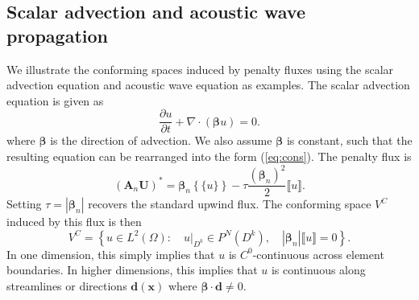 \documentclass[preprint,10pt]{elsarticle}
\newcommand{\pd}[2]{\frac{\partial#1}{\partial#2}}
\newcommand{\LRp}[1]{\left( #1 \right)}
\newcommand{\LRb}[1]{\left| #1 \right|}
\newcommand{\LRc}[1]{\left\{ #1 \right\}}
\newcommand{\Div} {\ensuremath{\nabla\cdot}}
\newcommand{\jump}[1] {\ensuremath{\llbracket#1\rrbracket}}
\newcommand{\avg}[1] {\ensuremath{\LRc{\!\{#1\}\!}}}
\newcommand{\note}[1]{{\color{blue}#1}}
\begin{document}
\subsection{Scalar advection and acoustic wave propagation}
\label{sec:confexamples}
We illustrate the conforming spaces induced by penalty fluxes using the scalar advection equation and acoustic wave equation as examples.  The scalar advection equation is given as
\[
\pd{u}{t} + \Div\LRp{\bm{\beta}u} = 0.
\]
where $\bm{\beta}$ is the direction of advection.  \note{We also assume $\bm{\beta}$ is constant, such that the resulting equation can be rearranged into the form (\ref{eq:cons}).}  The penalty flux is 
\[
(\bm{A}_n\bm{U})^* = \bm{\beta}_n\avg{ u} - \tau\frac{\LRp{\bm{\beta}_n}^2}{2}\jump{u}.
\]
\note{Setting $\tau = \LRb{\bm{\beta}_n}$ recovers the standard upwind flux.}  
The conforming space $V^C$ induced by this flux is then
\[
V^C = \LRc{ u \in L^2\LRp{\Omega} : \quad \left.u\right|_{D^k} \in P^N(D^k), \quad \LRb{\bm{\beta}_n}\jump{u} = 0}.
\]
In one dimension, this simply implies that $u$ is $C^0$-continuous across element boundaries.  In higher dimensions, this implies that $u$ is continuous along streamlines or directions $\bm{d}(\bm{x})$ where $\bm{\beta}\cdot \bm{d} \neq 0$.  
\end{document}

